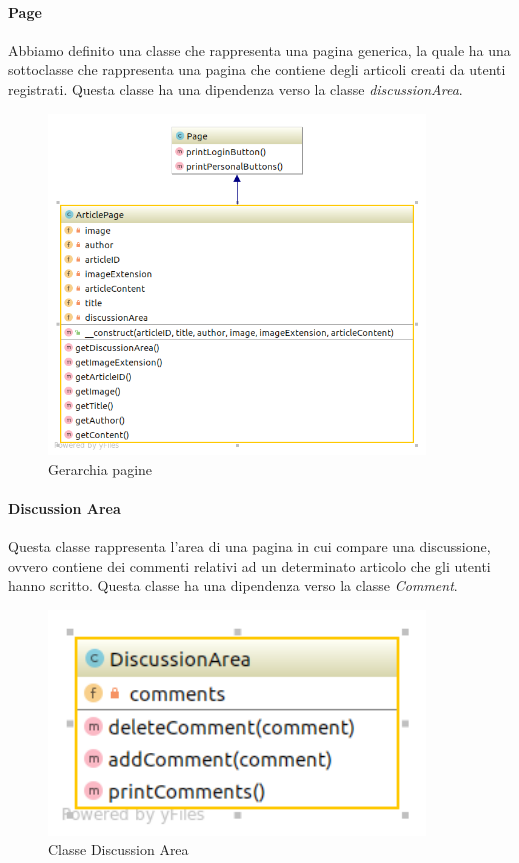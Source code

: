\paragraph{Page} Abbiamo definito una classe che rappresenta una pagina generica, la quale ha una sottoclasse che rappresenta una pagina che contiene degli articoli creati da utenti registrati. Questa classe ha una dipendenza verso la classe \textit{discussionArea}.
\begin{figure}[H]
	\begin{center}
		\includegraphics[width=10cm]{img/Page.png}
		\caption{Gerarchia pagine}
	\end{center}
\end{figure}

\paragraph{Discussion Area} Questa classe rappresenta l'area di una pagina in cui compare una discussione, ovvero contiene dei commenti relativi ad un determinato articolo che gli utenti hanno scritto. Questa classe ha una dipendenza verso la classe \textit{Comment}.
\begin{figure}[H]
	\begin{center}
		\includegraphics[width=10cm]{img/DiscussionArea.png}
		\caption{Classe Discussion Area}
	\end{center}
\end{figure}

